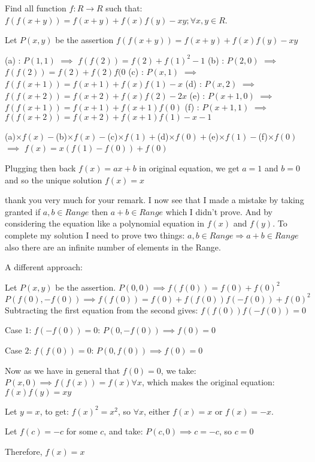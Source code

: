 \begin{solution}
	\begin{tcolorbox}Find all function $f:R \rightarrow R$ such that:
$f(f(x+y))=f(x+y)+f(x)f(y)-xy;\forall x,y \in R$.\end{tcolorbox}
Let $P(x,y)$ be the assertion $f(f(x+y))=f(x+y)+f(x)f(y)-xy$

(a) : $P(1,1)$ $\implies$ $f(f(2))=f(2)+f(1)^2-1$
(b) : $P(2,0)$ $\implies$ $f(f(2))=f(2)+f(2)f(0$
(c) : $P(x,1)$ $\implies$ $f(f(x+1))=f(x+1)+f(x)f(1)-x$
(d) : $P(x,2)$ $\implies$ $f(f(x+2))=f(x+2)+f(x)f(2)-2x$
(e) : $P(x+1,0)$ $\implies$ $f(f(x+1))=f(x+1)+f(x+1)f(0)$
(f) : $P(x+1,1)$ $\implies$ $f(f(x+2))=f(x+2)+f(x+1)f(1)-x-1$

(a)$\times f(x)-$(b)$\times f(x)-$(c)$\times f(1)+$(d)$\times f(0)+$(e)$\times f(1)-$(f)$\times f(0)$ $\implies$ $f(x)=x(f(1)-f(0))+f(0)$

Plugging then back $f(x)=ax+b$ in original equation, we get $a=1$ and $b=0$ and so the unique solution $\boxed{f(x)=x}$
\end{solution}



\begin{solution}
	thank you very much for your remark.
I now see that I made a mistake by taking granted if $a, b \in Range$ then $a+b \in Range$ which I didn't prove. And by considering the equation like a polynomial equation in $f(x)$ and $f(y).$
To complete my solution I need to prove two things:
$a,b \in Range \Longrightarrow a+b \in Range$ also there are an infinite number of elements in the Range.
\end{solution}



\begin{solution}
	A different approach:

Let $P(x,y)$ be the assertion.
$P(0,0) \implies f(f(0))=f(0)+f(0)^2$
$P(f(0),-f(0)) \implies f(f(0))=f(0)+f(f(0))f(-f(0))+f(0)^2$
Subtracting the first equation from the second gives:
$f(f(0))f(-f(0))=0$

Case $1$: $f(-f(0))=0$:
$P(0,-f(0)) \implies f(0)=0$

Case $2$: $f(f(0))=0$:
$P(0,f(0)) \implies f(0)=0$

Now as we have in general that $f(0)=0$, we take:
$P(x,0) \implies f(f(x))=f(x) \forall x$, which makes the original equation:
$f(x)f(y)=xy$

Let $y=x$, to get:
$f(x)^2=x^2$, so $\forall x$, either $f(x)=x$ or $f(x)=-x$.

Let $f(c)=-c$ for some $c$, and take:
$P(c,0) \implies c=-c$, so $c=0$

Therefore, $f(x)=x$
\end{solution}



